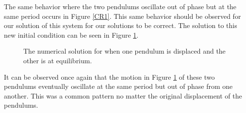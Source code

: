 \documentclass[twocolumn]{article}
\begin{document}
\newline
The same behavior where the two pendulums oscillate out of phase but at the same period occurs in Figure \ref{CR1}. This same behavior should be observed for our solution of this system for our solutions to be correct. The solution to this new initial condition can be seen in Figure \ref{CR2}.
\begin{figure}[htb!]
\begin{center}
\caption{The numerical solution for when one pendulum is displaced and the other is at equilibrium.}
\label{CR2}
\end{center}
\end{figure}
\newline
It can be observed once again that the motion in Figure \ref{CR2} of these two pendulums eventually oscillate at the same period but out of phase from one another. This was a common pattern no matter the original displacement of the pendulums.
\end{document}

